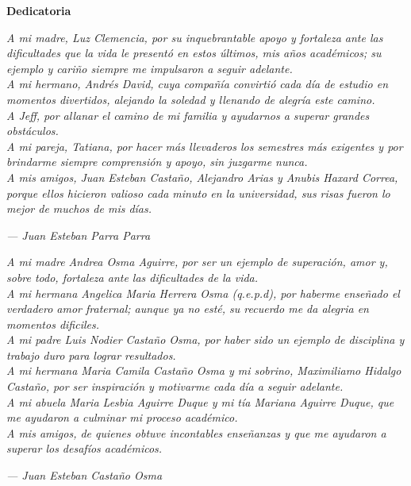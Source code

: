 \cleardoublepage%
%
\thispagestyle{empty}


\begin{center}
	{\Large\bfseries Dedicatoria}
\end{center}


\begin{center}
	\textit{
		A mi madre, Luz Clemencia, por su inquebrantable apoyo y fortaleza ante las dificultades que la vida le presentó en estos últimos, mis años académicos; su ejemplo y cariño siempre me impulsaron a seguir adelante.\\
		A mi hermano, Andrés David, cuya compañía convirtió cada día de estudio en momentos divertidos, alejando la soledad y llenando de alegría este camino.\\
		A Jeff, por allanar el camino de mi familia y ayudarnos a superar grandes obstáculos.\\
		A mi pareja, Tatiana, por hacer más llevaderos los semestres más exigentes y por brindarme siempre comprensión y apoyo, sin juzgarme nunca.\\
		A mis amigos, Juan Esteban Castaño, Alejandro Arias y Anubis Haxard Correa, porque ellos hicieron valioso cada minuto en la universidad, sus risas fueron lo mejor de muchos de mis días.
	}
	\vspace{1cm}

	\hfill \textit{--- Juan Esteban Parra Parra}

	\vspace{2cm}

	\textit{
		A mi madre Andrea Osma Aguirre, por ser un ejemplo de superación, amor y, sobre todo, fortaleza ante las dificultades de la vida.
		\\
		A mi hermana Angelica Maria Herrera Osma (q.e.p.d), por haberme enseñado el verdadero amor fraternal; aunque ya no esté, su recuerdo me da alegria en momentos dificiles.
		\\
		A mi padre Luis Nodier Castaño Osma, por haber sido un ejemplo de disciplina y trabajo duro para lograr resultados.
		\\
		A mi hermana Maria Camila Castaño Osma y mi sobrino, Maximiliamo Hidalgo Castaño, por ser inspiración y motivarme cada día a seguir adelante.
		\\
		A mi abuela Maria Lesbia Aguirre Duque y mi tía Mariana Aguirre Duque, que me ayudaron a culminar mi proceso académico.
		\\
		A mis amigos, de quienes obtuve incontables enseñanzas y que me ayudaron a superar los desafíos académicos.
	}

	\vspace{1cm}

	\hfill \textit{--- Juan Esteban Castaño Osma}
\end{center}
